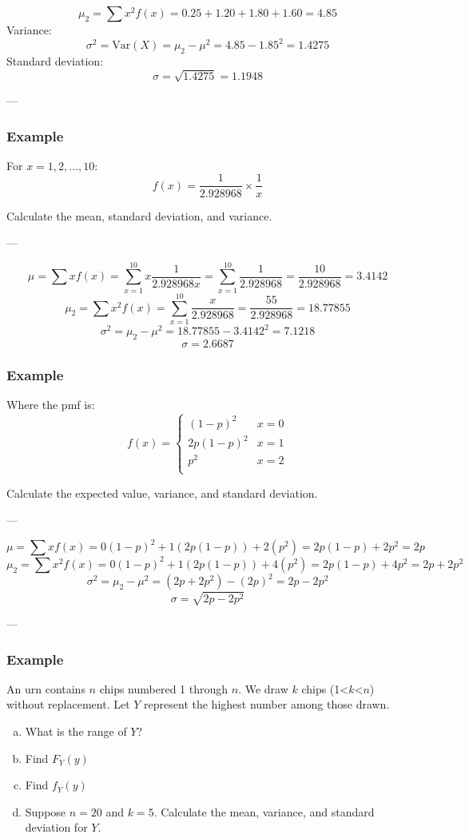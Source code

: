 \documentclass{report}
\begin{document}
$$\mu_2 = \sum x^2 f(x) = 0.25 + 1.20 + 1.80 + 1.60 = 4.85 $$
Variance: $$\sigma^2 = \text{Var}(X) = \mu_2 - \mu^2 = 4.85 - 1.85^2 = \boxed{1.4275}$$
Standard deviation: $$ \sigma = \sqrt{ 1.4275 } = \boxed{1.1948}$$

---

\subsubsection*{Example}

For $x = 1,2, \dots, 10$: $$f(x) = \frac{1}{2.928968} \times  \frac{1}{x}$$ 

Calculate the mean, standard deviation, and variance. 

---

$$\mu = \sum x f(x) = \sum_{x=1}^{10} x \frac{1}{2.928968x} = \sum_{x=1}^{10} \frac{1}{2.928968}  =\frac{10}{2.928968} = \boxed{3.4142}$$
$$\mu_2 = \sum x^2 f(x) = \sum_{x=1}^{10} \frac{x}{2.928968}  =\frac{55}{2.928968} = \boxed{18.77855}$$
$$\sigma^2 = \mu_2 - \mu^2 = 18.77855 - 3.4142^2 = \boxed{7.1218}$$
$$\sigma =  \boxed{2.6687}$$

\subsubsection*{Example}

Where the pmf is: $$f(x) = \begin{cases}
(1-p)^2 & x=0 \\
2p(1-p)^2 & x=1 \\
p^2 & x=2 \\
\end{cases}$$

Calculate the expected value, variance, and standard deviation. 

---

$$\mu = \sum xf(x) = 0(1-p)^2 + 1(2p(1-p)) + 2(p^2) = 2p(1-p) + 2p^2 = \boxed{2p}$$
$$\mu_2 = \sum x^2 f(x) = 0(1-p)^2 + 1(2p(1-p)) + 4(p^2) = 2p(1-p) + 4p^2 = 2p + 2p^2$$
$$\sigma^2 = \mu_2 - \mu^2 = (2p+2p^2) - (2p)^2 = \boxed{2p -2p^2}$$
$$\sigma =  \boxed{\sqrt{2p -2p^2}}$$

--- 

\subsubsection*{Example}

An urn contains $n$ chips numbered 1 through $n$. We draw $k$ chips (1<$k$<$n$) without replacement. Let $Y$ represent the highest number among those drawn. \begin{enumerate}[(a)]
\item What is the range of $Y$?
\item Find $F_Y(y)$
\item Find $f_Y(y)$
\item Suppose $n=20$ and $k=5$. Calculate the mean, variance, and standard deviation for $Y$.
\end{enumerate}
\end{document}
